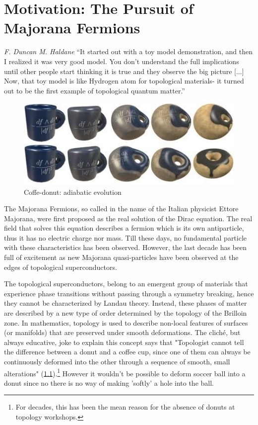 \chapter{ Motivation: The Pursuit of Majorana Fermions \label{chap:Majorana}}


\begin{chapquote}{\textit{F. Duncan M. Haldane}}
``It started out with a toy model demonstration, and then I realized it was very good model.  You don't understand the full implications until other people start thinking it is true and they observe the big picture [...] Now, that toy model is like Hydrogen atom for topological materials- it turned out to be the first example of topological quantum matter.''
\end{chapquote}
\begin{figure}[b]
  \centering
  \includegraphics[scale = 0.5]{IMAGES/Majorana/Coffe&donuts.jpg}
  \caption{Coffe-donut: adiabatic evolution \label{fig:Coffe}}
\end{figure}

The  Majorana Fermions, so called in the name of the Italian physicist Ettore Majorana, were first proposed as the real solution of the Dirac equation. The real field that solves this equation describes a fermion which is its own antiparticle, thus it has no electric charge  nor mass.  Till these days, no fundamental particle with these characteristics has been observed. However, the last decade has been full of excitement as new Majorana quasi-particles have been observed at the edges of topological superconductors.

The topological superconductors, belong to an emergent group of materials that experience phase transitions without passing through a symmetry breaking, hence they cannot be characterized by Landau theory. Instead, these phases of matter are described by  a new type of order determined by the topology of the Brilloin zone. In mathematics, topology is used to describe non-local features of surfaces (or manifolds) that are preserved under smooth deformations. The clich\'e, but always educative, joke to explain this concept says that "Topologist cannot tell the difference between a donut and a coffee cup, since one of them 
can always be continuously deformed into the other through a
sequence of smooth, small alterations" (\ref{fig:Coffe}).\footnote{For decades, this has been the mean reason for the absence of donuts at topology workshops.} However it wouldn't be possible to deform soccer ball into  a donut since no there is no way of making 'softly' a hole into the ball.  

